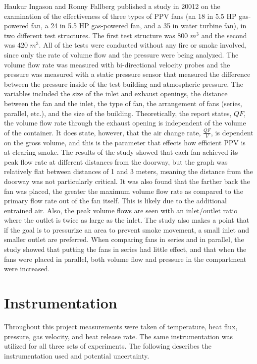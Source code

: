 \documentclass{article}
\begin{document}
Haukur Ingason and Ronny Fallberg published a study in 20012 on the examination of the effectiveness of three types of PPV fans (an 18 in 5.5 HP gas-powered fan, a 24 in 5.5 HP gas-powered fan, and a 35 in water turbine fan), in two different test structures. The first test structure was 800 $m^3$ and the second was 420 $m^3$. All of the tests were conducted without any fire or smoke involved, since only the rate of volume flow and the pressure were being analyzed. The volume flow rate was measured with bi-directional velocity probes and the pressure was measured with a static pressure sensor that measured the difference between the pressure inside of the test building and atmospheric pressure. The variables included the size of the inlet and exhaust openings, the distance between the fan and the inlet, the type of fan, the arrangement of fans (series, parallel, etc.), and the size of the building. Theoretically, the report states, $QF$, the volume flow rate through the exhaust opening is independent of the volume of the container. It does state, however, that the air change rate, $\frac{QF}{V}$, is dependent on the gross volume, and this is the parameter that effects how efficient PPV is at clearing smoke. The results of the study showed that each fan achieved its peak flow rate at different distances from the doorway, but the graph was relatively flat between distances of 1 and 3 meters, meaning the distance from the doorway was not particularly critical. It was also found that the farther back the fan was placed, the greater the maximum volume flow rate as compared to the primary flow rate out of the fan itself. This is likely due to the additional entrained air. Also, the peak volume flows are seen with an inlet/outlet ratio where the outlet is twice as large as the inlet. The study also makes a point that if the goal is to pressurize an area to prevent smoke movement, a small inlet and smaller outlet are preferred. When comparing fans in series and in parallel, the study showed that putting the fans in series had little effect, and that when the fans were placed in parallel, both volume flow and pressure in the compartment were increased.\cite{PPVmediumhouse}

\clearpage

\section{Instrumentation}
Throughout this project measurements were taken of temperature, heat flux, pressure, gas velocity, and heat release rate. The same instrumentation was utilized for all three sets of experiments. The following describes the instrumentation used and potential uncertainty.
\end{document}
